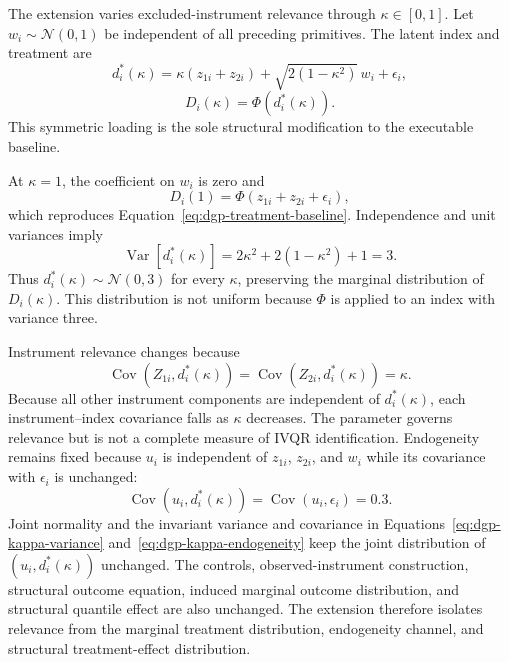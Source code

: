 The extension varies excluded-instrument relevance through $\kappa\in[0,1]$. Let $w_i\sim\mathcal{N}(0,1)$ be independent of all preceding primitives. The latent index and treatment are
\begin{equation}
  d_i^*(\kappa)
  =\kappa(z_{1i}+z_{2i})
  +\sqrt{2(1-\kappa^2)}\,w_i
  +\epsilon_i,
  \label{eq:dgp-kappa-index}
\end{equation}
\begin{equation}
  D_i(\kappa)=\Phi\!\left(d_i^*(\kappa)\right).
  \label{eq:dgp-treatment-kappa}
\end{equation}
This symmetric loading is the sole structural modification to the executable baseline.

At $\kappa=1$, the coefficient on $w_i$ is zero and
\begin{equation}
  D_i(1)=\Phi(z_{1i}+z_{2i}+\epsilon_i),
  \label{eq:dgp-kappa-baseline}
\end{equation}
which reproduces Equation~\eqref{eq:dgp-treatment-baseline}. Independence and unit variances imply
\begin{equation}
  \operatorname{Var}\!\left[d_i^*(\kappa)\right]
  =2\kappa^2+2(1-\kappa^2)+1=3.
  \label{eq:dgp-kappa-variance}
\end{equation}
Thus $d_i^*(\kappa)\sim\mathcal{N}(0,3)$ for every $\kappa$, preserving the marginal distribution of $D_i(\kappa)$. This distribution is not uniform because $\Phi$ is applied to an index with variance three.

Instrument relevance changes because
\begin{equation}
  \operatorname{Cov}\!\left(Z_{1i},d_i^*(\kappa)\right)
  =\operatorname{Cov}\!\left(Z_{2i},d_i^*(\kappa)\right)
  =\kappa.
  \label{eq:dgp-kappa-relevance}
\end{equation}
Because all other instrument components are independent of $d_i^*(\kappa)$, each instrument--index covariance falls as $\kappa$ decreases. The parameter governs relevance but is not a complete measure of IVQR identification. Endogeneity remains fixed because $u_i$ is independent of $z_{1i}$, $z_{2i}$, and $w_i$ while its covariance with $\epsilon_i$ is unchanged:
\begin{equation}
  \operatorname{Cov}\!\left(u_i,d_i^*(\kappa)\right)
  =\operatorname{Cov}(u_i,\epsilon_i)=0.3.
  \label{eq:dgp-kappa-endogeneity}
\end{equation}
Joint normality and the invariant variance and covariance in Equations~\eqref{eq:dgp-kappa-variance} and~\eqref{eq:dgp-kappa-endogeneity} keep the joint distribution of $(u_i,d_i^*(\kappa))$ unchanged. The controls, observed-instrument construction, structural outcome equation, induced marginal outcome distribution, and structural quantile effect are also unchanged. The extension therefore isolates relevance from the marginal treatment distribution, endogeneity channel, and structural treatment-effect distribution.

